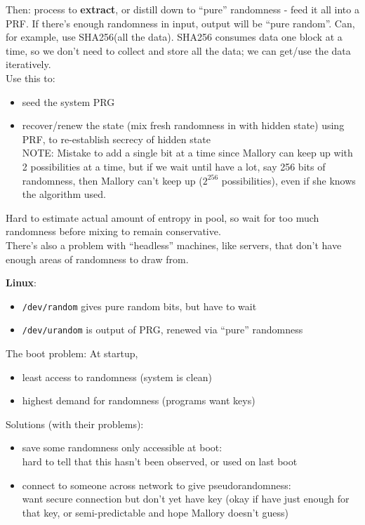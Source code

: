 Then: process to \textbf{extract}, or distill down to ``pure''
randomness - feed it all into a PRF. If there's enough randomness in
input, output will be ``pure random''.  Can, for example, use
SHA256(all the data). SHA256 consumes data one block at a time, so we don't 
need to collect and store all the data; we can get/use the data iteratively.\\

 Use this to:
\begin{itemize}
    \item seed the system PRG
    \item recover/renew the state (mix fresh randomness in with hidden state) using PRF,
        to re-establish secrecy of hidden state\\

        NOTE: Mistake to add a single bit at a time since Mallory can keep
        up with 2 possibilities at a time, but if we wait until have a
        lot, say 256 bits of randomness, then Mallory can't keep up ($2^{256}$
        possibilities), even if she knows the algorithm used.
\end{itemize}

Hard to estimate actual amount of entropy in pool, so wait for too
much randomness before mixing to remain conservative.\\
There's also a problem with ``headless'' machines, like servers, that don't have
enough areas of randomness to draw from.

{\bf Linux}:
\begin{itemize}
    \item {\tt /dev/random} gives pure random bits, but have to wait
    \item {\tt /dev/urandom} is output of PRG, renewed via ``pure'' randomness
\end{itemize}

The boot problem: At startup,
\begin{itemize}
    \item least access to randomness (system is clean)
    \item highest demand for randomness (programs want keys)
\end{itemize}

Solutions (with their problems):
\begin{itemize}
    \item save some randomness only accessible at boot:\\
        hard to tell that this hasn't been observed, or used on last boot
    \item connect to someone across network to give pseudorandomness:\\
        want secure connection but don't yet have key (okay if have just enough
        for that key, or semi-predictable and hope Mallory doesn't guess)
\end{itemize}

